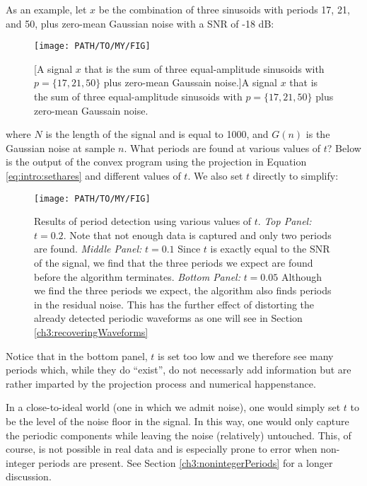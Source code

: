         As an example, let $x$ be the combination of three sinusoids with periods 17, 21, and 50, plus zero-mean Gaussian noise with a SNR of -18 dB:
        \begin{figure}[h]
            \centering
            \texttt{[image: PATH/TO/MY/FIG]}
            \caption{[A signal $x$ that is the sum of three equal-amplitude sinusoids with $p = \{17, 21, 50\}$ plus zero-mean Gaussain noise.]A signal $x$ that is the sum of three equal-amplitude sinusoids with $p = \{17, 21, 50\}$ plus zero-mean Gaussain noise.}
            \label{fig:detection:stopFunction:residual:sinesPlusNoise}
        \end{figure}
        where $N$ is the length of the signal and is equal to 1000, and $G(n)$ is the Gaussian noise at sample $n$. What periods are found at various values of $t$? Below is the output of the convex program using the projection in Equation \eqref{eq:intro:sethares} and different values of $t$. We also set $t$ directly to simplify:
        \begin{figure}[h]
            \centering
            \texttt{[image: PATH/TO/MY/FIG]}
            \caption[A figure showing the effect of different threshold values for the stop function.]{Results of period detection using various values of $t$. \emph{Top Panel:} $t = 0.2$. Note that not enough data is captured and only two periods are found. \emph{Middle Panel:} $t = 0.1$ Since $t$ is exactly equal to the SNR of the signal, we find that the three periods we expect are found before the algorithm terminates. \emph{Bottom Panel:} $t = 0.05$ Although we find the three periods we expect, the algorithm also finds periods in the residual noise. This has the further effect of distorting the already detected periodic waveforms as one will see in Section \ref{ch3:recoveringWaveforms}}
            \label{fig:detection:stopFunction:thresholdEffect}
        \end{figure}
        Notice that in the bottom panel, $t$ is set too low and we therefore see many periods which, while they do ``exist'', do not necessarly add information but are rather imparted by the projection process and numerical happenstance.

        In a close-to-ideal world (one in which we admit noise), one would simply set $t$ to be the level of the noise floor in the signal. In this way, one would only capture the periodic components while leaving the noise (relatively) untouched. This, of course, is not possible in real data and is especially prone to error when non-integer periods are present. See Section \ref{ch3:nonintegerPeriods} for a longer discussion.


